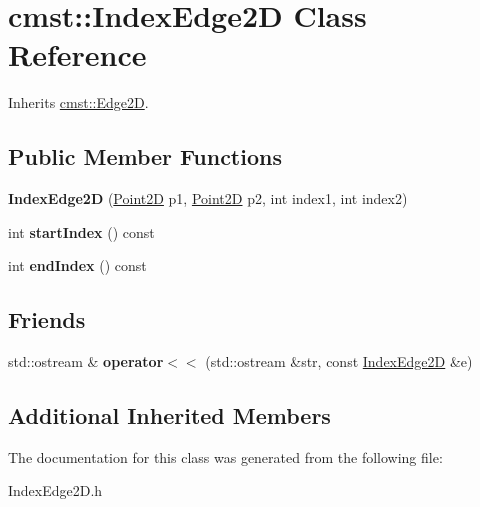\hypertarget{classcmst_1_1_index_edge2_d}{}\section{cmst\+:\+:Index\+Edge2D Class Reference}
\label{classcmst_1_1_index_edge2_d}


Inherits \hyperlink{classcmst_1_1_edge2_d}{cmst\+::\+Edge2D}.

\subsection*{Public Member Functions}
\begin{DoxyCompactItemize}
\item 
{\bfseries Index\+Edge2D} (\hyperlink{classcmst_1_1_point2_d}{Point2D} p1, \hyperlink{classcmst_1_1_point2_d}{Point2D} p2, int index1, int index2)\hypertarget{classcmst_1_1_index_edge2_d_aa01ca9e529a319fffb5f500ab7218ef6}{}\label{classcmst_1_1_index_edge2_d_aa01ca9e529a319fffb5f500ab7218ef6}

\item 
int {\bfseries start\+Index} () const \hypertarget{classcmst_1_1_index_edge2_d_ab92c0b814ea9c354a71acfc84c871f72}{}\label{classcmst_1_1_index_edge2_d_ab92c0b814ea9c354a71acfc84c871f72}

\item 
int {\bfseries end\+Index} () const \hypertarget{classcmst_1_1_index_edge2_d_ad50c559d38e5857c03be255774deff12}{}\label{classcmst_1_1_index_edge2_d_ad50c559d38e5857c03be255774deff12}

\end{DoxyCompactItemize}
\subsection*{Friends}
\begin{DoxyCompactItemize}
\item 
std\+::ostream \& {\bfseries operator$<$$<$} (std\+::ostream \&str, const \hyperlink{classcmst_1_1_index_edge2_d}{Index\+Edge2D} \&e)\hypertarget{classcmst_1_1_index_edge2_d_a07a17f57bc3f2f18232965531f0b62b4}{}\label{classcmst_1_1_index_edge2_d_a07a17f57bc3f2f18232965531f0b62b4}

\end{DoxyCompactItemize}
\subsection*{Additional Inherited Members}


The documentation for this class was generated from the following file\+:\begin{DoxyCompactItemize}
\item 
Index\+Edge2\+D.\+h\end{DoxyCompactItemize}
